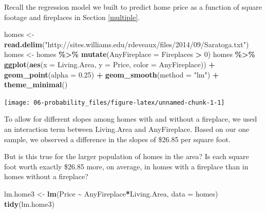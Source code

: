 \documentclass[
]{book}
\newenvironment{Shaded}{\begin{snugshade}}{\end{snugshade}}
\newcommand{\AttributeTok}[1]{\textcolor[rgb]{0.13,0.29,0.53}{#1}}
\newcommand{\DecValTok}[1]{\textcolor[rgb]{0.00,0.00,0.81}{#1}}
\newcommand{\FloatTok}[1]{\textcolor[rgb]{0.00,0.00,0.81}{#1}}
\newcommand{\FunctionTok}[1]{\textcolor[rgb]{0.13,0.29,0.53}{\textbf{#1}}}
\newcommand{\NormalTok}[1]{#1}
\newcommand{\OtherTok}[1]{\textcolor[rgb]{0.56,0.35,0.01}{#1}}
\newcommand{\SpecialCharTok}[1]{\textcolor[rgb]{0.81,0.36,0.00}{\textbf{#1}}}
\newcommand{\StringTok}[1]{\textcolor[rgb]{0.31,0.60,0.02}{#1}}
\begin{document}
Recall the regression model we built to predict home price as a function of square footage and fireplaces in Section \ref{multiple}.

\begin{Shaded}
\begin{Highlighting}[]
\NormalTok{homes }\OtherTok{\textless{}{-}} \FunctionTok{read.delim}\NormalTok{(}\StringTok{"http://sites.williams.edu/rdeveaux/files/2014/09/Saratoga.txt"}\NormalTok{)}
\NormalTok{homes }\OtherTok{\textless{}{-}}\NormalTok{ homes }\SpecialCharTok{\%\textgreater{}\%}
    \FunctionTok{mutate}\NormalTok{(}\AttributeTok{AnyFireplace =}\NormalTok{ Fireplaces }\SpecialCharTok{\textgreater{}} \DecValTok{0}\NormalTok{)}
\NormalTok{homes }\SpecialCharTok{\%\textgreater{}\%}
    \FunctionTok{ggplot}\NormalTok{(}\FunctionTok{aes}\NormalTok{(}\AttributeTok{x =}\NormalTok{ Living.Area, }\AttributeTok{y =}\NormalTok{ Price, }\AttributeTok{color =}\NormalTok{ AnyFireplace)) }\SpecialCharTok{+} 
    \FunctionTok{geom\_point}\NormalTok{(}\AttributeTok{alpha =} \FloatTok{0.25}\NormalTok{) }\SpecialCharTok{+}
    \FunctionTok{geom\_smooth}\NormalTok{(}\AttributeTok{method =} \StringTok{"lm"}\NormalTok{) }\SpecialCharTok{+}
    \FunctionTok{theme\_minimal}\NormalTok{()}
\end{Highlighting}
\end{Shaded}

\begin{center}\texttt{[image: 06-probability\_files/figure-latex/unnamed-chunk-1-1]} \end{center}

To allow for different slopes among homes with and without a fireplace, we used an interaction term between Living.Area and AnyFireplace. Based on our one sample, we observed a difference in the slopes of \$26.85 per square foot.

But is this true for the larger population of homes in the area? Is each square foot worth exactly \$26.85 more, on average, in homes with a fireplace than in homes without a fireplace?

\begin{Shaded}
\begin{Highlighting}[]
\NormalTok{lm.home3 }\OtherTok{\textless{}{-}} \FunctionTok{lm}\NormalTok{(Price }\SpecialCharTok{\textasciitilde{}}\NormalTok{ AnyFireplace}\SpecialCharTok{*}\NormalTok{Living.Area, }\AttributeTok{data =}\NormalTok{ homes)}
\FunctionTok{tidy}\NormalTok{(lm.home3)}
\end{Highlighting}
\end{Shaded}
\end{document}

